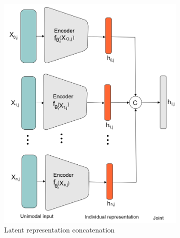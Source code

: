 \begin{figure}[htp!]
	\centering
	\begin{subfigure}{.48\linewidth}
		\centering
		\includegraphics[scale=0.4]{images/rl_1.png}
		\caption{Latent representation concatenation}
        \label{fig:lrc_1}
	\end{subfigure}
	\begin{subfigure}{0.48\linewidth}

\end{subfigure}
\end{figure}
